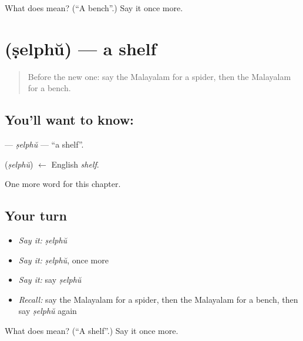 \begin{tcolorbox}[breakable,colback=teal!4,colframe=teal!35!black,title={Before you move on}]
What does  mean? (\textquotedblleft{}A bench\textquotedblright{}.) Say it once more.
\end{tcolorbox}
\section[\texorpdfstring{\ml{ഷെൽഫ്} (ṣelphŭ)}{ഷെൽഫ് (ṣelphŭ)}]{ (ṣelphŭ) — a shelf}

\label{lesson:ML-C328-selphu}



\begin{quote}
Before the new one: say the Malayalam for a spider, then the Malayalam for a bench.
\end{quote}

\subsection*{You'll want to know: }
\textbf{} — \emph{ṣelphŭ} — \textquotedblleft{}a shelf\textquotedblright{}.

\begin{cousinweb}
\textbf{} (\emph{ṣelphŭ}) $\leftarrow$ English \emph{shelf}.
\end{cousinweb}

\begin{grammarlens}[title={What you've built}]
One more word for this chapter.
\end{grammarlens}

\subsection*{Your turn}
\begin{itemize}
\raggedright
  \item \emph{Say it:} \emph{ṣelphŭ}
  \item \emph{Say it:} \emph{ṣelphŭ}, once more
  \item \emph{Say it:} say \emph{ṣelphŭ}
  \item \emph{Recall:} say the Malayalam for a spider, then the Malayalam for a bench, then say \emph{ṣelphŭ} again
\end{itemize}

\begin{tcolorbox}[breakable,colback=teal!4,colframe=teal!35!black,title={Before you move on}]
What does  mean? (\textquotedblleft{}A shelf\textquotedblright{}.) Say it once more.
\end{tcolorbox}
